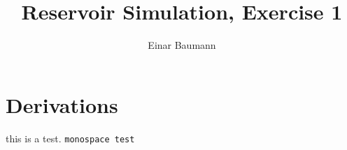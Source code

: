\documentclass[11pt,a4paper]{article}
\title{Reservoir Simulation, Exercise 1}
\author{Einar Baumann}
\begin{document}
  \maketitle

  \section{Derivations} %
  \label{sec:derivations}
  this is a test. \texttt{monospace test}
  
  
\end{document}
